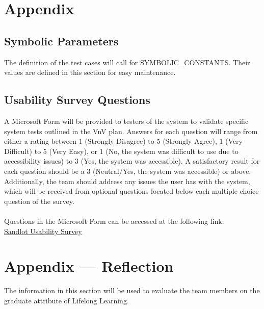 \documentclass[12pt, titlepage]{article}
\begin{document}
				




\newpage

\section{Appendix}

\subsection{Symbolic Parameters}

The definition of the test cases will call for SYMBOLIC\_CONSTANTS.
Their values are defined in this section for easy maintenance.

\subsection{Usability Survey Questions}

A Microsoft Form will be provided to testers of the system to validate specific
system tests outlined in the VnV plan. Answers for each question will range from either a
rating between 1 (Strongly Disagree) to 5 (Strongly Agree), 1 (Very Difficult) to 5 (Very Easy), or
1 (No, the system was difficult to use due to accessibility issues) to 3 (Yes, the system was accessible).
A satisfactory result for each question should be a 3 (Neutral/Yes, the system was accessible) or above.
Additionally, the team should address any issues the user has with the system, which will be received
from optional questions located below each multiple choice question of the survey.
\\\\Questions in the Microsoft Form can be accessed at the following link:\\

\href{https://forms.office.com/Pages/ResponsePage.aspx?id=B2M3RCm0rUKMJSjNSW9HcodvkeIlB8lOjrmyIWuVT7dUQ0hBNFRVTjFHWVhITDIzSklZRDRYTVZRMi4u}{Sandlot Usability Survey}

\newpage{}
\section*{Appendix --- Reflection}

The information in this section will be used to evaluate the team members on the
graduate attribute of Lifelong Learning.
\end{document}
